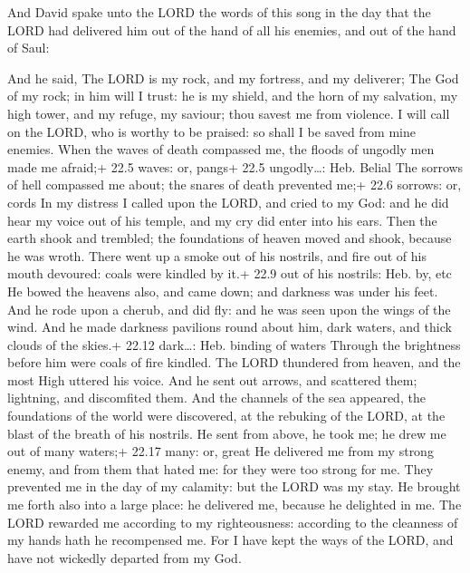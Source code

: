  And David spake unto the LORD the words of this song in the
day that the LORD had delivered him out of the hand of all his enemies,
and out of the hand of Saul:

 And he said, The LORD is my rock, and my fortress, and my
deliverer;  The God of my rock; in him will I trust: he is
my shield, and the horn of my salvation, my high tower, and my refuge,
my saviour; thou savest me from violence.  I will call on
the LORD, who is worthy to be praised: so shall I be saved from mine
enemies.  When the waves of death compassed me, the floods
of ungodly men made me afraid;+ 22.5 waves: or, pangs+ 22.5
ungodly\ldots: Heb. Belial  The sorrows of hell compassed me
about; the snares of death prevented me;+ 22.6 sorrows: or, cords
 In my distress I called upon the LORD, and cried to my God:
and he did hear my voice out of his temple, and my cry did enter into
his ears.  Then the earth shook and trembled; the
foundations of heaven moved and shook, because he was wroth.
 There went up a smoke out of his nostrils, and fire out of
his mouth devoured: coals were kindled by it.+ 22.9 out of his nostrils:
Heb. by, etc  He bowed the heavens also, and came down; and
darkness was under his feet.  And he rode upon a cherub,
and did fly: and he was seen upon the wings of the wind. 
And he made darkness pavilions round about him, dark waters, and thick
clouds of the skies.+ 22.12 dark\ldots: Heb. binding of waters
 Through the brightness before him were coals of fire
kindled.  The LORD thundered from heaven, and the most High
uttered his voice.  And he sent out arrows, and scattered
them; lightning, and discomfited them.  And the channels of
the sea appeared, the foundations of the world were discovered, at the
rebuking of the LORD, at the blast of the breath of his nostrils.
 He sent from above, he took me; he drew me out of many
waters;+ 22.17 many: or, great  He delivered me from my
strong enemy, and from them that hated me: for they were too strong for
me.  They prevented me in the day of my calamity: but the
LORD was my stay.  He brought me forth also into a large
place: he delivered me, because he delighted in me.  The
LORD rewarded me according to my righteousness: according to the
cleanness of my hands hath he recompensed me.  For I have
kept the ways of the LORD, and have not wickedly departed from my God.
